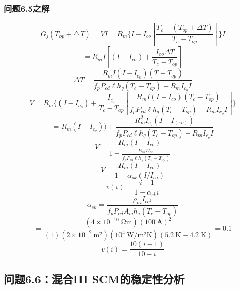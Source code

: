 \subsubsection{问题6.5之解}
\begin{equation}%
G_{j}(T_{op}+\triangle T)=VI=R_m\{I-I_{co}[\frac{T_c-(T_{op}+\Delta T)}{T_c-T_{op}}]\}I
\end{equation}
\begin{equation}%
=R_mI[(I-I_{co})+\frac{I_{co}\Delta T}{T_c-T_{op}}]
\end{equation}
\begin{equation}%
\Delta T=\frac{R_mI(I-I_{c_o})(T-T_{op})}{f_pP_{cd}\ell h_q(T_c-T_{op})-R_mI_{c_o}I}
\end{equation}
\begin{equation}%
V=R_m\{(I-I_{c_o})+\frac{I_{c_o}}{T_c-T_{op}}[\frac{R_mI(I-I_{co})(T_c-T_{op})}{f_pP_{cd}\ell h_q(T_c-T_{op})-R_mI_{c_o}I}]\}
\end{equation}
\begin{equation}%
=R_m(I-I_{c_o}))+\frac{R_m^2I_{c_o}(I-I_(co))}{f_pP_{cd}\ell h_q(T_c-T_{op})-R_mI_{c_o}I}
\end{equation}
\begin{equation}%
V=\frac{R_m(I-I_{co})}{1-\frac{R_mII_{co}}{f_pP_{cd}\ell h_q(T_c-T_{op})}}
\end{equation}
\begin{equation}%
V=\frac{R_m(I-I_{co})}{1-\alpha_{sk}(I/I_{co})}
\end{equation}
\begin{equation}%
v(i)=\frac{i-1}{1-\alpha_{sk}i}
\end{equation}
\begin{equation}%
\alpha_{sk}=\frac{\rho_mI_{co^2}}{f_pP_{cd}A_mh_q(T_c-T_{op})}
\end{equation}
\begin{equation}%
=\frac{(4\times10^{-10}\ \mathrm{\Omega m})(100\ \mathrm{A})^2}{(1)(2\times10^{-2}\ \mathrm{m^2})(10^4\ \mathrm{W/m^2K})(5.2\ \mathrm{K}-4.2\ \mathrm{K})}=0.1
\end{equation}
\begin{equation}%
v(i)=\frac{10(i-1)}{10-i}
\end{equation}


\subsection{问题6.6：混合III SCM的稳定性分析}

